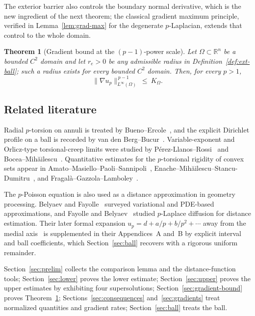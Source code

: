 \documentclass[11pt]{article}
\newcommand{\R}{\mathbb R}
\newcommand{\norm}[1]{\lVert #1\rVert}
\newtheorem{theorem}{Theorem}[section]
\theoremstyle{definition}
\theoremstyle{remark}
\begin{document}
The exterior barrier also controls the boundary normal derivative, which is
the new ingredient of the next theorem; the classical gradient maximum
principle, verified in Lemma~\ref{lem:grad-max} for the degenerate
$p$-Laplacian, extends that control to the whole domain.
\begin{theorem}[Gradient bound at the $(p-1)$-power scale]\label{thm:gradient-bound}
Let $\Omega\subset\R^n$ be a bounded $C^2$ domain and let $r_e>0$ be any
admissible radius in Definition~\ref{def:ext-ball}; such a radius exists for
every bounded $C^2$ domain. Then, for every $p>1$,
\begin{equation}\label{eq:gradient-bound}
\norm{\nabla u_p}_{L^\infty(\Omega)}^{\,p-1}\ \le\ K_\Omega.
\end{equation}
\end{theorem}

\subsection*{Related literature}
Radial $p$-torsion on annuli is treated by Bueno--Ercole~\cite{BE2015}, and
the explicit Dirichlet profile on a ball is recorded by van den
Berg--Bucur~\cite{VdBB2014}. Variable-exponent and Orlicz-type
torsional-creep limits were studied by P\'erez-Llanos--Rossi~\cite{PLR} and
Bocea--Mih\u{a}ilescu~\cite{BocMih}. Quantitative estimates for the
$p$-torsional rigidity of convex sets appear in
Amato--Masiello--Paoli--Sannipoli~\cite{AMPS},
Enache--Mih\u{a}ilescu--Stancu-Dumitru~\cite{EMSD}, and
Fragal\`a--Gazzola--Lamboley~\cite{FGL}.

The $p$-Poisson equation is also used as a distance approximation in geometry
processing. Belyaev and Fayolle~\cite{BF2015} surveyed variational and PDE-based
approximations, and Fayolle and Belyaev~\cite{FB2018} studied $p$-Laplace
diffusion for distance estimation. Their later formal expansion
$u_p=d+a/p+b/p^2+\cdots$ away from the medial axis~\cite{FB2026} is
supplemented in their Appendices~A and~B by explicit interval and ball
coefficients, which Section~\ref{sec:ball} recovers with a rigorous uniform
remainder.

Section~\ref{sec:prelim} collects the comparison lemma and the
distance-function tools; Section~\ref{sec:lower} proves the lower estimate;
Section~\ref{sec:upper} proves the upper estimates by exhibiting four
supersolutions; Section~\ref{sec:gradient-bound} proves
Theorem~\ref{thm:gradient-bound}; Sections~\ref{sec:consequences}
and~\ref{sec:gradients} treat normalized quantities and gradient rates;
Section~\ref{sec:ball} treats the ball. 
\end{document}
